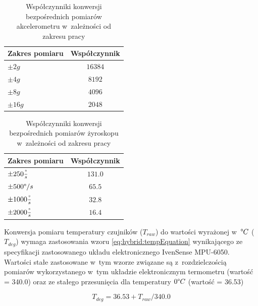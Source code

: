 

\begin{table}[!htp]
	\centering
	\caption{Współczynniki konwersji bezpośrednich pomiarów akcelerometru w~zależności od zakresu pracy}
	\label{tab:hybrid:accRangeFactors} 
	\begin{tabular}{|l|c|}
		\hline
		Zakres pomiaru              & Współczynnik \\ \hline
		$\pm2g$                     & $16384$        \\ \hline
		\rowcolor{black!20} $\pm4g$ & $8192$         \\ \hline
		$\pm8g$                     & $4096$         \\ \hline
		$\pm16g$                    & $2048$         \\ \hline
	\end{tabular}
\end{table}
\begin{table}[!htp]
	\centering
	\caption{Współczynniki konwersji bezpośrednich pomiarów żyroskopu w~zależności od zakresu pracy}	
	\label{tab:hybrid:gyroRangeFactors}	
	\begin{tabular}{|l|c|}
		\hline
		Zakres pomiaru                        & Współczynnik \\ \hline
		$\pm250\frac{\degree}{s}$             & $131.0$        \\ \hline
		\rowcolor{black!20} $\pm500\degree/s$ & $65.5$         \\ \hline
		$\pm1000\frac{\degree}{s}$            & $32.8$         \\ \hline
		$\pm2000\frac{\degree}{s}$            & $16.4$         \\ \hline
	\end{tabular}
\end{table} 		
 

Konwersja pomiaru temperatury czujników ($T_{raw}$) do wartości wyrażonej w~$\degree C$ ($T_{deg}$) wymaga zastosowania wzoru \eqref{eq:hybrid:tempEquation} wynikającego ze specyfikacji zastosowanego układu elektronicznego IvenSense MPU-6050. Wartości stałe zastosowane w~tym wzorze związane są z~rozdzielczością pomiarów wykorzystanego w~tym układzie elektronicznym termometru (wartość = 340.0) oraz ze stałego przesunięcia dla temperatury $0 \degree C$ (wartość = 36.53)

\begin{equation}
	T_{deg} = 36.53 + T_{raw} / 340.0
	\label{eq:hybrid:tempEquation}
\end{equation}

